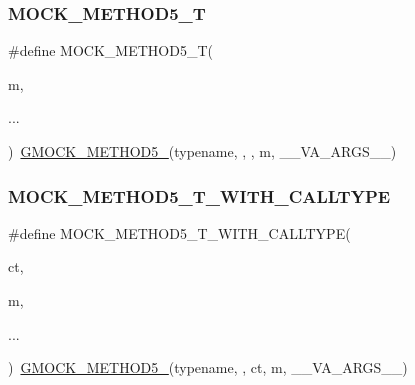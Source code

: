 \mbox{\label{googletest-master_2googlemock_2include_2gmock_2gmock-generated-function-mockers_8h_a3566f9bd057c5cee1841f55cbf685947}} 
\subsubsection{\texorpdfstring{MOCK\_METHOD5\_T}{MOCK\_METHOD5\_T}}
{\footnotesize\ttfamily \#define M\+O\+C\+K\+\_\+\+M\+E\+T\+H\+O\+D5\+\_\+T(\begin{DoxyParamCaption}\item[{}]{m,  }\item[{}]{... }\end{DoxyParamCaption})~\mbox{\hyperlink{_obj__test_2lib_2googletest-release-1_88_81_2googlemock_2include_2gmock_2gmock-generated-function-mockers_8h_a9e3ecd392499ab19a4a6d3adcabf56f6}{G\+M\+O\+C\+K\+\_\+\+M\+E\+T\+H\+O\+D5\+\_\+}}(typename, , , m, \+\_\+\+\_\+\+V\+A\+\_\+\+A\+R\+G\+S\+\_\+\+\_\+)}

\mbox{\label{googletest-master_2googlemock_2include_2gmock_2gmock-generated-function-mockers_8h_a04f83b372ebe63dea92cb5c3502ff345}} 
\subsubsection{\texorpdfstring{MOCK\_METHOD5\_T\_WITH\_CALLTYPE}{MOCK\_METHOD5\_T\_WITH\_CALLTYPE}}
{\footnotesize\ttfamily \#define M\+O\+C\+K\+\_\+\+M\+E\+T\+H\+O\+D5\+\_\+\+T\+\_\+\+W\+I\+T\+H\+\_\+\+C\+A\+L\+L\+T\+Y\+PE(\begin{DoxyParamCaption}\item[{}]{ct,  }\item[{}]{m,  }\item[{}]{... }\end{DoxyParamCaption})~\mbox{\hyperlink{_obj__test_2lib_2googletest-release-1_88_81_2googlemock_2include_2gmock_2gmock-generated-function-mockers_8h_a9e3ecd392499ab19a4a6d3adcabf56f6}{G\+M\+O\+C\+K\+\_\+\+M\+E\+T\+H\+O\+D5\+\_\+}}(typename, , ct, m, \+\_\+\+\_\+\+V\+A\+\_\+\+A\+R\+G\+S\+\_\+\+\_\+)}

